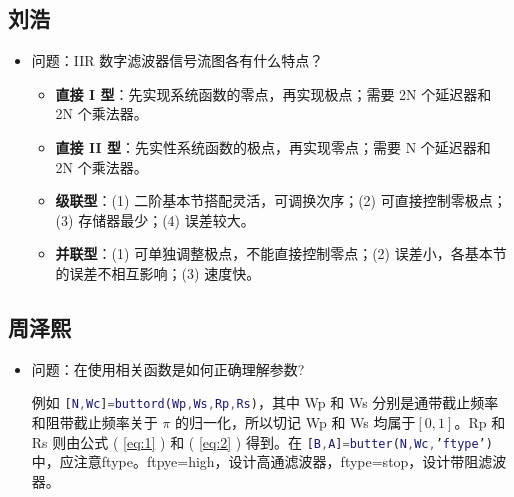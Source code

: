\documentclass[12pt,AutoFakeBold]{article}
\begin{document}
\subsection{刘浩}

\begin{itemize}
\item 问题：IIR 数字滤波器信号流图各有什么特点？

\begin{itemize}
\item \textbf{直接 I 型}：先实现系统函数的零点，再实现极点；需要 2N 个延迟器和 2N 个乘法器。
\item \textbf{直接 II 型}：先实性系统函数的极点，再实现零点；需要 N 个延迟器和 2N 个乘法器。
\item \textbf{级联型}：(1) 二阶基本节搭配灵活，可调换次序；(2) 可直接控制零极点；(3) 存储器最少；(4) 误差较大。
\item \textbf{并联型}：(1) 可单独调整极点，不能直接控制零点；(2) 误差小，各基本节的误差不相互影响；(3) 速度快。
\end{itemize}
\end{itemize}

\subsection{周泽熙}

\begin{itemize}
\item 问题：在使用相关函数是如何正确理解参数?

例如 \lstinline[language=Matlab]|[N,Wc]=buttord(Wp,Ws,Rp,Rs)|，其中 Wp 和 Ws 分别是通带截止频率和阻带截止频率关于 $\pi$ 的归一化，所以切记 Wp 和 Ws 均属于$[0,1]$。Rp 和 Rs 则由公式 ( \ref{eq:1} ) 和 ( \ref{eq:2} ) 得到。在 \lstinline[language=Matlab]|[B,A]=butter(N,Wc,’ftype’)| 中，应注意ftype。ftpye=high，设计高通滤波器，ftype=stop，设计带阻滤波器。

\end{itemize}



\end{document}
